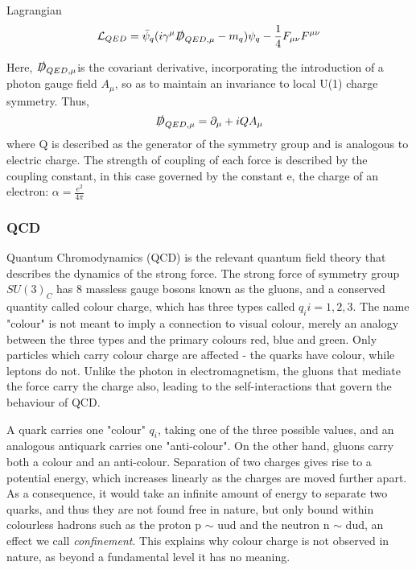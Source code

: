 Lagrangian 
\begin{equation}
{\mathcal{L}}_{QED} = \bar{\psi}_{q}(i \gamma^{\mu}\slashed{D}_{QED,\mu} - m_{q}) \psi_{q} - \frac{1}{4}F_{\mu \nu}F^{\mu \nu}
\label{eqn:QEDL}
\end{equation}

Here, $\slashed{D}_{QED,\mu}$is the covariant derivative, incorporating the introduction of a photon gauge field $A_{\mu}$, so as to maintain an invariance to local U(1) charge symmetry. Thus, 
\begin{equation}
\slashed{D}_{QED,\mu} = \partial_{\mu} + iQA_{\mu}
\end{equation}
where Q is described as the generator of the symmetry group and is analogous to electric charge. The strength of coupling of each force is described by the coupling constant, in this case governed by the constant e, the charge of an electron: $\alpha = \frac{e^{2}}{4\pi}$ 

\subsubsection{QCD}

Quantum Chromodynamics (QCD) is the relevant quantum field theory that describes the dynamics of the strong force. The strong force of symmetry group $SU(3)_{C}$ has 8 massless gauge bosons known as the gluons, and a conserved quantity called colour charge, which has three types called $q_{i} i=1,2,3$. The name "colour" is not meant to imply a connection to visual colour, merely an analogy between the three types and the primary colours red, blue and green. Only particles which carry colour charge are affected - the quarks have colour, while leptons do not. Unlike the photon in electromagnetism, the gluons that mediate the force carry the charge also, leading to the self-interactions that govern the behaviour of QCD. 

A quark carries one "colour" $q_{i}$, taking one of the three possible values, and an analogous antiquark carries one "anti-colour". On the other hand, gluons carry both a colour and an anti-colour.  Separation of two charges gives rise to a potential energy, which increases linearly as the charges are moved further apart. As a consequence, it would take an infinite amount of energy to separate two quarks, and thus they are not found free in nature, but only bound within colourless hadrons such as the proton p $\sim$ uud and the neutron n $\sim$ dud, an effect we call \textit{confinement}. This explains why colour charge is not observed in nature, as beyond a fundamental level it has no meaning.

